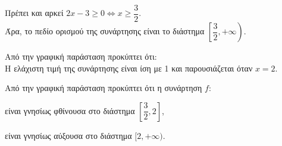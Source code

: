 \begin{alist}
\item Πρέπει και αρκεί $2x - 3 \ge 0 \Leftrightarrow x \ge \dfrac{3}{2}$. \\
Άρα, το πεδίο ορισμού της συνάρτησης είναι το διάστημα $\left[\dfrac{3}{2}, +\infty\right)$.
\item Από την γραφική παράσταση προκύπτει ότι: \\
Η ελάχιστη τιμή της συνάρτησης είναι ίση με 1 και παρουσιάζεται όταν $x = 2$.
\item Από την γραφική παράσταση προκύπτει ότι η συνάρτηση $f$:
\begin{rlist}
\item είναι γνησίως φθίνουσα στο διάστημα $\left[\dfrac{3}{2}, 2\right]$,
\item είναι γνησίως αύξουσα στο διάστημα $[2, +\infty)$.
\end{rlist}
\end{alist}

